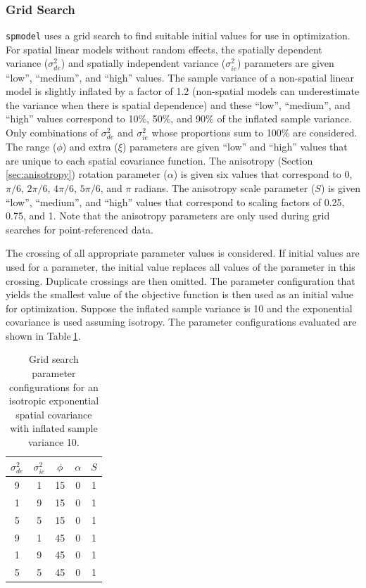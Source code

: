 \documentclass{article}
\begin{document}
\hypertarget{grid-search}{%
\subsubsection{Grid Search}\label{grid-search}}

\texttt{spmodel} uses a grid search to find suitable initial values for
use in optimization. For spatial linear models without random effects,
the spatially dependent variance (\(\sigma^2_{de}\)) and spatially
independent variance (\(\sigma^2_{ie}\)) parameters are given ``low'',
``medium'', and ``high'' values. The sample variance of a non-spatial
linear model is slightly inflated by a factor of 1.2 (non-spatial models
can underestimate the variance when there is spatial dependence) and
these ``low'', ``medium'', and ``high'' values correspond to 10\%, 50\%,
and 90\% of the inflated sample variance. Only combinations of
\(\sigma^2_{de}\) and \(\sigma^2_{ie}\) whose proportions sum to 100\%
are considered. The range (\(\phi\)) and extra (\(\xi\)) parameters are
given ``low'' and ``high'' values that are unique to each spatial
covariance function. The anisotropy (Section\(~\)\ref{sec:anisotropy})
rotation parameter (\(\alpha\)) is given six values that correspond to
0, \(\pi/6\), \(2\pi/6\), \(4\pi/6\), \(5\pi/6\), and \(\pi\) radians.
The anisotropy scale parameter (\(S\)) is given ``low'', ``medium'', and
``high'' values that correspond to scaling factors of 0.25, 0.75, and 1.
Note that the anisotropy parameters are only used during grid searches
for point-referenced data.

The crossing of all appropriate parameter values is considered. If
initial values are used for a parameter, the initial value replaces all
values of the parameter in this crossing. Duplicate crossings are then
omitted. The parameter configuration that yields the smallest value of
the objective function is then used as an initial value for
optimization. Suppose the inflated sample variance is 10 and the
exponential covariance is used assuming isotropy. The parameter
configurations evaluated are shown in Table\(~\)\ref{tab:grid1}.

\begin{table}
  \centering
  \begin{tabular}{ccccc}
  \hline
  $\sigma^2_{de}$ & $\sigma^2_{ie}$ & $\phi$ & $\alpha$ & $S$ \\
  \hline
  9 & 1 & 15 & 0 & 1 \\
  1 & 9 & 15 & 0 & 1 \\
  5 & 5 & 15 & 0 & 1 \\
  9 & 1 & 45 & 0 & 1 \\
  1 & 9 & 45 & 0 & 1 \\
  5 & 5 & 45 & 0 & 1 \\
  \hline
  \end{tabular}
  \caption{Grid search parameter configurations for an isotropic exponential spatial covariance with inflated sample variance 10.}
  \label{tab:grid1}
\end{table}
\end{document}
